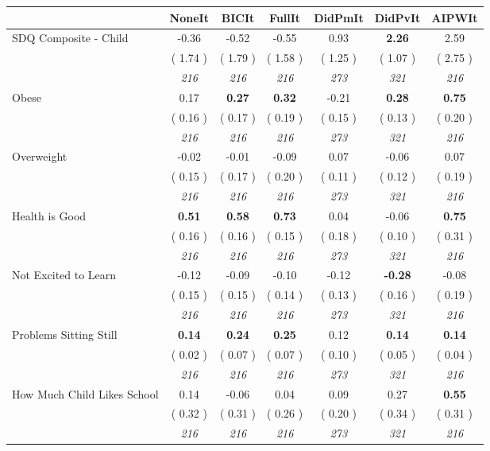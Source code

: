\begin{tabular}{l c c c c c c}
\toprule
 & NoneIt & BICIt & FullIt & DidPmIt & DidPvIt & AIPWIt \\
\midrule
SDQ Composite - Child &     -0.36 &     -0.52 &     -0.55 &      0.93 & \textbf{      2.26 } &      2.59 \\
& (     1.74 ) & (     1.79 ) & (     1.58 ) & (     1.25 ) & (     1.07 ) & (     2.75 ) \\
& \textit{ 216 } & \textit{ 216 } & \textit{ 216 } & \textit{ 273 } & \textit{ 321 } & \textit{ 216 } \\
Obese &      0.17 & \textbf{      0.27 } & \textbf{      0.32 } &     -0.21 & \textbf{      0.28 } & \textbf{     0.75} \\
& (     0.16 ) & (     0.17 ) & (     0.19 ) & (     0.15 ) & (     0.13 ) & (     0.20 ) \\
& \textit{ 216 } & \textit{ 216 } & \textit{ 216 } & \textit{ 273 } & \textit{ 321 } & \textit{ 216 } \\
Overweight &     -0.02 &     -0.01 &     -0.09 &      0.07 &     -0.06 &      0.07 \\
& (     0.15 ) & (     0.17 ) & (     0.20 ) & (     0.11 ) & (     0.12 ) & (     0.19 ) \\
& \textit{ 216 } & \textit{ 216 } & \textit{ 216 } & \textit{ 273 } & \textit{ 321 } & \textit{ 216 } \\
Health is Good & \textbf{      0.51 } & \textbf{      0.58 } & \textbf{      0.73 } &      0.04 &     -0.06 & \textbf{     0.75} \\
& (     0.16 ) & (     0.16 ) & (     0.15 ) & (     0.18 ) & (     0.10 ) & (     0.31 ) \\
& \textit{ 216 } & \textit{ 216 } & \textit{ 216 } & \textit{ 273 } & \textit{ 321 } & \textit{ 216 } \\
Not Excited to Learn &     -0.12 &     -0.09 &     -0.10 &     -0.12 & \textbf{     -0.28 } &     -0.08 \\
& (     0.15 ) & (     0.15 ) & (     0.14 ) & (     0.13 ) & (     0.16 ) & (     0.19 ) \\
& \textit{ 216 } & \textit{ 216 } & \textit{ 216 } & \textit{ 273 } & \textit{ 321 } & \textit{ 216 } \\
Problems Sitting Still & \textbf{      0.14 } & \textbf{      0.24 } & \textbf{      0.25 } &      0.12 & \textbf{      0.14 } & \textbf{     0.14} \\
& (     0.02 ) & (     0.07 ) & (     0.07 ) & (     0.10 ) & (     0.05 ) & (     0.04 ) \\
& \textit{ 216 } & \textit{ 216 } & \textit{ 216 } & \textit{ 273 } & \textit{ 321 } & \textit{ 216 } \\
How Much Child Likes School &      0.14 &     -0.06 &      0.04 &      0.09 &      0.27 & \textbf{     0.55} \\
& (     0.32 ) & (     0.31 ) & (     0.26 ) & (     0.20 ) & (     0.34 ) & (     0.31 ) \\
& \textit{ 216 } & \textit{ 216 } & \textit{ 216 } & \textit{ 273 } & \textit{ 321 } & \textit{ 216 } \\
\bottomrule
\end{tabular}
